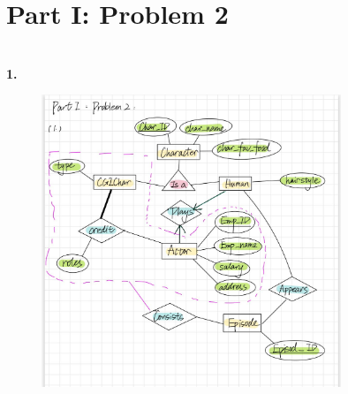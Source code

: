 \documentclass[letterpaper,11pt]{article}
\newcommand{\Paragraph}[1]{~\vspace*{-0.7\baselineskip}\\{\bf #1}}
\begin{document}
\section*{Part I: Problem 2}
\Paragraph{1.}
\begin{figure}[h]
    \centering
    \includegraphics[width=0.8\textwidth]{p1-2-1.jpg}
\end{figure}
\end{document}
